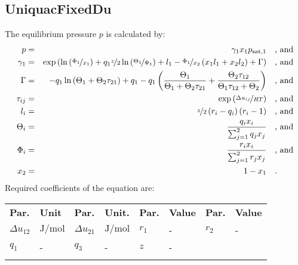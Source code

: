 %
\subsection{UniquacFixedDu}
\label{cha:approaches:abs:act:uniquac_fdu}
%
The equilibrium pressure $p$ is calculated by:
%
\begin{equation*}
	\begin{split}
		p &=& \gamma_1 x_1 p_\mathrm{sat,1} & \quad\text{, and} \\
		\gamma_1 &=& \exp \left( \ln \left( \nicefrac{\Phi_1}{x_1} \right) + q_1 \nicefrac{z}{2} \ln \left( \nicefrac{\Theta_1}{\Phi_1} \right) + l_1 - \nicefrac{\Phi_1}{x_2} \left( x_1 l_1 + x_2 l_2 \right) + \Gamma \right) & \quad\text{, and} \\
		\Gamma &=& - q_1 \ln \left( \Theta_1 + \Theta_2 \tau_{21} \right) + q_1 - q_1 \left( \frac{\Theta_1}{\Theta_1 + \Theta_2 \tau_{21}} + \frac{\Theta_2 \tau_{12}}{\Theta_1 \tau_{12} + \Theta_2} \right) & \quad\text{, and} \\
		\tau_{ij} &=& \exp \left( \nicefrac{\Delta u_{ij}}{R T} \right) & \quad\text{, and} \\
		l_i &=& \nicefrac{z}{2} \left( r_i - q_i \right) \left(r_i - 1 \right) & \quad\text{, and} \\
		\Theta_i &=& \frac{q_i x_i}{\sum_{j=1}^{2} q_j x_j} & \quad\text{, and} \\
		\Phi_i &=& \frac{r_i x_i}{\sum_{j=1}^{2} r_j x_j} & \quad\text{, and} \\
		x_2 &=& 1 - x_1  & \quad\text{.} \\
	\end{split}
\end{equation*}
%
Required coefficients of the equation are:
%
\begin{longtable}[l]{ll|ll|ll|ll}
\toprule
\addlinespace
\textbf{Par.} & \textbf{Unit} & \textbf{Par.} &	\textbf{Unit.} & \textbf{Par.} & \textbf{Value} & \textbf{Par.} & \textbf{Value} \\
\addlinespace
\midrule
\endhead

\bottomrule
\endfoot
\bottomrule
\endlastfoot
\addlinespace

$\Delta u_{12}$ & $\si{\joule\per\mole}$ &  $\Delta u_{21}$ & $\si{\joule\per\mole}$ & $r_{1}$ & - & $r_{2}$ & - \\
$q_{1}$ & - & $q_{3}$ & - & $z$ & - & &  \\

\addlinespace
\end{longtable}

